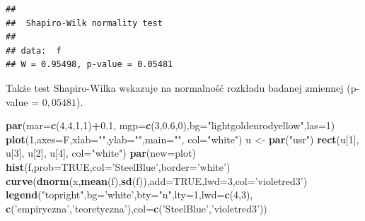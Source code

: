 \documentclass[polish,]{book}
\newenvironment{Shaded}{\begin{snugshade}}{\end{snugshade}}
\newcommand{\DataTypeTok}[1]{\textcolor[rgb]{0.13,0.29,0.53}{#1}}
\newcommand{\DecValTok}[1]{\textcolor[rgb]{0.00,0.00,0.81}{#1}}
\newcommand{\FloatTok}[1]{\textcolor[rgb]{0.00,0.00,0.81}{#1}}
\newcommand{\KeywordTok}[1]{\textcolor[rgb]{0.13,0.29,0.53}{\textbf{#1}}}
\newcommand{\NormalTok}[1]{#1}
\newcommand{\OperatorTok}[1]{\textcolor[rgb]{0.81,0.36,0.00}{\textbf{#1}}}
\newcommand{\OtherTok}[1]{\textcolor[rgb]{0.56,0.35,0.01}{#1}}
\newcommand{\StringTok}[1]{\textcolor[rgb]{0.31,0.60,0.02}{#1}}
\begin{document}
\begin{verbatim}
## 
##  Shapiro-Wilk normality test
## 
## data:  f
## W = 0.95498, p-value = 0.05481
\end{verbatim}

Także test Shapiro-Wilka wskazuje na normalność rozkładu badanej zmiennej (p-value = \(0,05481\)).

\begin{Shaded}
\begin{Highlighting}[]
\KeywordTok{par}\NormalTok{(}\DataTypeTok{mar=}\KeywordTok{c}\NormalTok{(}\DecValTok{4}\NormalTok{,}\DecValTok{4}\NormalTok{,}\DecValTok{1}\NormalTok{,}\DecValTok{1}\NormalTok{)}\OperatorTok{+}\FloatTok{0.1}\NormalTok{, }\DataTypeTok{mgp=}\KeywordTok{c}\NormalTok{(}\DecValTok{3}\NormalTok{,}\FloatTok{0.6}\NormalTok{,}\DecValTok{0}\NormalTok{),}\DataTypeTok{bg=}\StringTok{"lightgoldenrodyellow"}\NormalTok{,}\DataTypeTok{las=}\DecValTok{1}\NormalTok{)}
\KeywordTok{plot}\NormalTok{(}\DecValTok{1}\NormalTok{,}\DataTypeTok{axes=}\NormalTok{F,}\DataTypeTok{xlab=}\StringTok{""}\NormalTok{,}\DataTypeTok{ylab=}\StringTok{""}\NormalTok{,}\DataTypeTok{main=}\StringTok{""}\NormalTok{, }\DataTypeTok{col=}\StringTok{"white"}\NormalTok{)}
\NormalTok{u <-}\StringTok{ }\KeywordTok{par}\NormalTok{(}\StringTok{"usr"}\NormalTok{)}
\KeywordTok{rect}\NormalTok{(u[}\DecValTok{1}\NormalTok{], u[}\DecValTok{3}\NormalTok{], u[}\DecValTok{2}\NormalTok{], u[}\DecValTok{4}\NormalTok{], }\DataTypeTok{col=}\StringTok{"white"}\NormalTok{)}
\KeywordTok{par}\NormalTok{(}\DataTypeTok{new=}\NormalTok{plot)}
\KeywordTok{hist}\NormalTok{(f,}\DataTypeTok{prob=}\OtherTok{TRUE}\NormalTok{,}\DataTypeTok{col=}\StringTok{'SteelBlue'}\NormalTok{,}\DataTypeTok{border=}\StringTok{'white'}\NormalTok{)}
\KeywordTok{curve}\NormalTok{(}\KeywordTok{dnorm}\NormalTok{(x,}\KeywordTok{mean}\NormalTok{(f),}\KeywordTok{sd}\NormalTok{(f)),}\DataTypeTok{add=}\OtherTok{TRUE}\NormalTok{,}\DataTypeTok{lwd=}\DecValTok{3}\NormalTok{,}\DataTypeTok{col=}\StringTok{'violetred3'}\NormalTok{)}
\KeywordTok{legend}\NormalTok{(}\StringTok{"topright"}\NormalTok{,}\DataTypeTok{bg=}\StringTok{'white'}\NormalTok{,}\DataTypeTok{bty=}\StringTok{"n"}\NormalTok{,}\DataTypeTok{lty=}\DecValTok{1}\NormalTok{,}\DataTypeTok{lwd=}\KeywordTok{c}\NormalTok{(}\DecValTok{4}\NormalTok{,}\DecValTok{3}\NormalTok{),}
       \KeywordTok{c}\NormalTok{(}\StringTok{'empiryczna'}\NormalTok{,}\StringTok{'teoretyczna'}\NormalTok{),}\DataTypeTok{col=}\KeywordTok{c}\NormalTok{(}\StringTok{'SteelBlue'}\NormalTok{,}\StringTok{'violetred3'}\NormalTok{))}
\end{Highlighting}
\end{Shaded}
\end{document}
